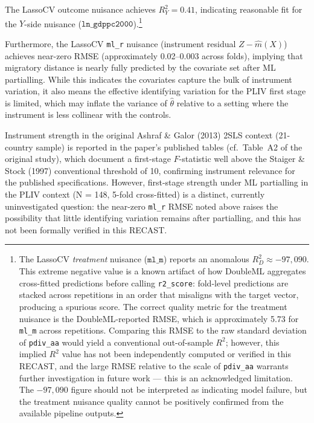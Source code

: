 \documentclass[12pt,letterpaper]{article}
\begin{document}
The LassoCV outcome nuisance achieves $R^2_Y = 0.41$, indicating reasonable
fit for the $Y$-side nuisance ($\texttt{ln\_gdppc2000}$).\footnote{The
LassoCV \emph{treatment} nuisance ($\texttt{ml\_m}$) reports an anomalous
$R^2_D \approx -97{,}090$. This extreme negative value is a known artifact
of how DoubleML aggregates cross-fitted predictions before calling
\texttt{r2\_score}: fold-level predictions are stacked across repetitions in
an order that misaligns with the target vector, producing a spurious score.
The correct quality metric for the treatment nuisance is the DoubleML-reported
RMSE, which is approximately 5.73 for \texttt{ml\_m} across repetitions.
Comparing this RMSE to the raw standard deviation of \texttt{pdiv\_aa} would
yield a conventional out-of-sample $R^2$; however, this implied $R^2$ value
has not been independently computed or verified in this RECAST, and the large
RMSE relative to the scale of \texttt{pdiv\_aa} warrants further investigation
in future work --- this is an acknowledged limitation.
The $-97{,}090$ figure should not be interpreted as indicating model failure,
but the treatment nuisance quality cannot be positively confirmed from the
available pipeline outputs.}

Furthermore, the LassoCV \texttt{ml\_r} nuisance (instrument residual
$Z - \hat{m}(X)$) achieves near-zero RMSE (approximately 0.02--0.003 across
folds), implying that migratory distance is nearly fully predicted by the
covariate set after ML partialling. While this indicates the covariates
capture the bulk of instrument variation, it also means the effective
identifying variation for the PLIV first stage is limited, which may
inflate the variance of $\hat{\theta}$ relative to a setting where the
instrument is less collinear with the controls.

Instrument strength in the original Ashraf \& Galor (2013) 2SLS context
(21-country sample) is reported in the paper's published tables (cf.\ Table~A2
of the original study), which document a first-stage $F$-statistic well above
the Staiger \& Stock (1997) conventional threshold of 10, confirming
instrument relevance for the published specifications.
However, first-stage strength under ML partialling in the PLIV context
(N = 148, 5-fold cross-fitted) is a distinct, currently uninvestigated
question: the near-zero \texttt{ml\_r} RMSE noted above raises the
possibility that little identifying variation remains after partialling,
and this has not been formally verified in this RECAST.


\end{document}

